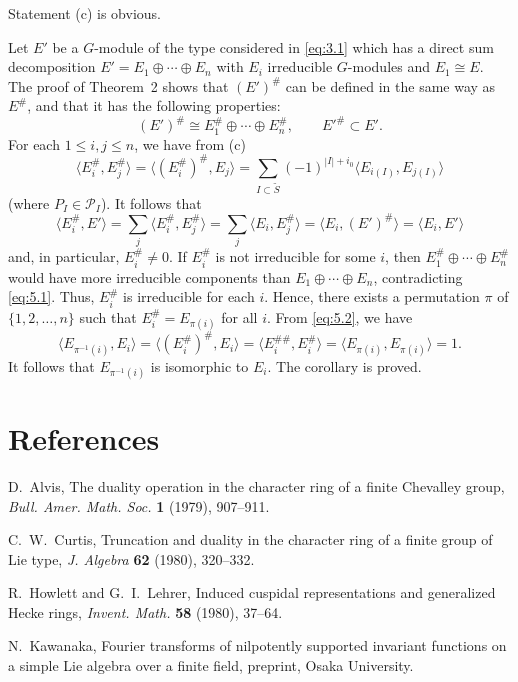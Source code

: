 \documentclass[12pt,a4paper]{article}
\theoremstyle{plain}
\theoremstyle{definition}
\theoremstyle{remark}
\newcommand{\cP}{\mathcal{P}}
\providecommand{\cP}{\mathcal{P}}
\begin{document}
Statement (c) is obvious.

Let $E'$ be a $G$-module of the type considered in \eqref{eq:3.1} which has a direct sum decomposition $E' = E_1 \oplus \cdots \oplus E_n$ with $E_i$ irreducible $G$-modules and $E_1 \cong E$. The proof of Theorem~2 shows that $(E')^\#$ can be defined in the same way as $E^\#$, and that it has the following properties:
\begin{equation}\label{eq:5.1}
(E')^\# \cong E_1^\# \oplus \cdots \oplus E_n^\#, \qquad E'^\# \subset E'.
\end{equation}
For each $1 \leq i, j \leq n$, we have from (c)
\begin{equation}\label{eq:5.2}
\langle E_i^\#, E_j^\# \rangle = \langle (E_i^\#)^\#, E_j \rangle = \sum_{I \subset \tilde{S}} (-1)^{|I|+i_0} \langle E_{i(I)}, E_{j(I)} \rangle
\end{equation}
(where $P_I \in \cP_I$). It follows that
\begin{equation*}
\langle E_i^\#, E' \rangle = \sum_j \langle E_i^\#, E_j^\# \rangle = \sum_j \langle E_i, E_j^\# \rangle = \langle E_i, (E')^\# \rangle = \langle E_i, E' \rangle
\end{equation*}
and, in particular, $E_i^\# \neq 0$. If $E_i^\#$ is not irreducible for some $i$, then $E_1^\# \oplus \cdots \oplus E_n^\#$ would have more irreducible components than $E_1 \oplus \cdots \oplus E_n$, contradicting \eqref{eq:5.1}. Thus, $E_i^\#$ is irreducible for each $i$. Hence, there exists a permutation $\pi$ of $\{1,2,\dots,n\}$ such that $E_i^\# = E_{\pi(i)}$ for all $i$. From \eqref{eq:5.2}, we have
\begin{equation*}
\langle E_{\pi^{-1}(i)}, E_i \rangle = \langle (E_i^\#)^\#, E_i \rangle = \langle E_i^{\#\#}, E_i^\# \rangle = \langle E_{\pi(i)}, E_{\pi(i)} \rangle = 1.
\end{equation*}
It follows that $E_{\pi^{-1}(i)}$ is isomorphic to $E_i$. The corollary is proved.

\section*{References}

\begin{enumerate}[label={[\arabic*]}, leftmargin=*, itemsep=2pt]
\item D.~Alvis, The duality operation in the character ring of a finite Chevalley group, \textit{Bull. Amer. Math. Soc.} \textbf{1} (1979), 907--911.
\item C.~W.~Curtis, Truncation and duality in the character ring of a finite group of Lie type, \textit{J. Algebra} \textbf{62} (1980), 320--332.
\item R.~Howlett and G.~I.~Lehrer, Induced cuspidal representations and generalized Hecke rings, \textit{Invent. Math.} \textbf{58} (1980), 37--64.
\item N.~Kawanaka, Fourier transforms of nilpotently supported invariant functions on a simple Lie algebra over a finite field, preprint, Osaka University.
\end{enumerate}
\end{document}
